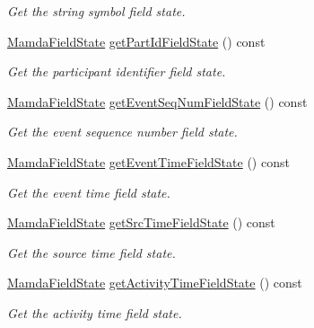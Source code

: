 \begin{CompactItemize}
\begin{CompactList}\small\item\em Get the string symbol field state. \item\end{CompactList}\item 
\hyperlink{namespaceWombat_93aac974f2ab713554fd12a1fa3b7d2a}{Mamda\-Field\-State} \hyperlink{classWombat_1_1MamdaBookAtomicListener_43081dcece02d10a8291cd9326c550f3}{get\-Part\-Id\-Field\-State} () const 
\begin{CompactList}\small\item\em Get the participant identifier field state. \item\end{CompactList}\item 
\hyperlink{namespaceWombat_93aac974f2ab713554fd12a1fa3b7d2a}{Mamda\-Field\-State} \hyperlink{classWombat_1_1MamdaBookAtomicListener_3ee620bcb87714cb80033e9eeda630dc}{get\-Event\-Seq\-Num\-Field\-State} () const 
\begin{CompactList}\small\item\em Get the event sequence number field state. \item\end{CompactList}\item 
\hyperlink{namespaceWombat_93aac974f2ab713554fd12a1fa3b7d2a}{Mamda\-Field\-State} \hyperlink{classWombat_1_1MamdaBookAtomicListener_db8ff2c8d4bcbf00307474add61e741e}{get\-Event\-Time\-Field\-State} () const 
\begin{CompactList}\small\item\em Get the event time field state. \item\end{CompactList}\item 
\hyperlink{namespaceWombat_93aac974f2ab713554fd12a1fa3b7d2a}{Mamda\-Field\-State} \hyperlink{classWombat_1_1MamdaBookAtomicListener_22cb444aedd516da0ea66a2a6ca85d39}{get\-Src\-Time\-Field\-State} () const 
\begin{CompactList}\small\item\em Get the source time field state. \item\end{CompactList}\item 
\hyperlink{namespaceWombat_93aac974f2ab713554fd12a1fa3b7d2a}{Mamda\-Field\-State} \hyperlink{classWombat_1_1MamdaBookAtomicListener_9910ae16b92a548bce1821ed98de8956}{get\-Activity\-Time\-Field\-State} () const 
\begin{CompactList}\small\item\em Get the activity time field state. \item\end{CompactList}\item 

\end{CompactItemize}
